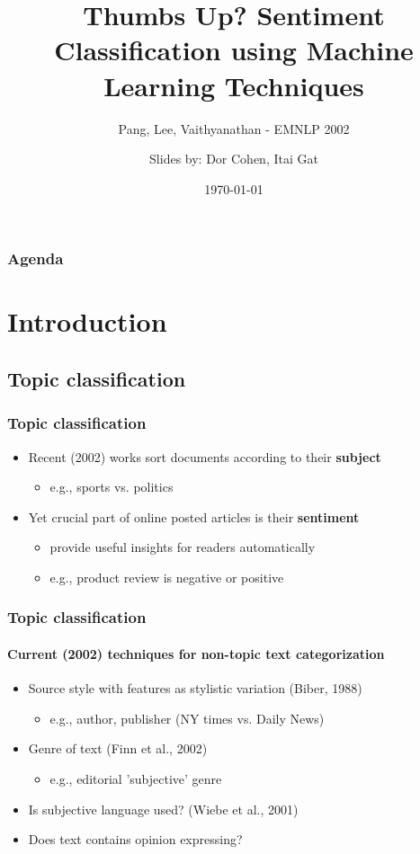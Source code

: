 \documentclass{beamer}
\title{Thumbs Up? Sentiment Classification using Machine Learning Techniques}
\subtitle{Pang, Lee, Vaithyanathan - EMNLP 2002}
\author{Slides by: Dor Cohen, Itai Gat}
\institute{IE @ Technion}
\date{\today}
\begin{document}
\begin{frame}
	\titlepage
\end{frame}

\begin{frame}
	\frametitle{Agenda}
	\tableofcontents
\end{frame}

\section{Introduction}
\subsection{Topic classification}

\begin{frame}
	\frametitle{Topic classification}
	\begin{itemize}
	\item Recent (2002) works sort documents according to their \textbf{subject}
	\begin{itemize}
		\item e.g., sports vs. politics
	\end{itemize}
	\pause
	\item Yet crucial part of online posted articles is their \textbf{sentiment}
	\begin{itemize}
		\item provide useful insights for readers automatically
		\item e.g., product review is negative or positive
	\end{itemize}

	\end{itemize}
\end{frame}

\begin{frame}
	\frametitle{Topic classification}
	\framesubtitle{Current (2002) techniques for non-topic text categorization}
	\begin{itemize}
		\item Source style with features as stylistic variation (Biber, 1988)
		\begin{itemize}
			\item e.g., author, publisher (NY times vs. Daily News)
		\end{itemize}
		\item Genre of text (Finn et al., 2002)
		\begin{itemize}
			\item e.g., editorial 'subjective' genre
		\end{itemize}
		\item Is subjective language used? (Wiebe et al., 2001)
		\item Does text contains opinion expressing?
	\end{itemize}
\end{frame}
\end{document}
